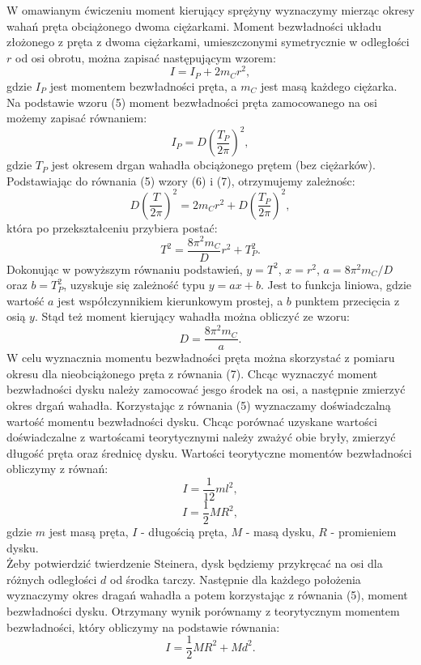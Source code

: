 \documentclass[10pt,a4paper]{article}
\newcommand{\forceindent}{\leavevmode{\parindent=3em\indent}}
\begin{document}
\forceindent W omawianym ćwiczeniu moment kierujący sprężyny wyznaczymy mierząc okresy wahań pręta obciążonego dwoma ciężarkami. Moment bezwładności układu złożonego z pręta z dwoma ciężarkami, umieszczonymi symetrycznie w odległości $r$ od osi obrotu, można zapisać następującym wzorem:
\begin{equation}
I = I_P + 2m_{C}r^2,
\end{equation}
gdzie $I_P$ jest momentem bezwładności pręta, a $m_C$ jest masą każdego ciężarka. \\
Na podstawie wzoru (5) moment bezwładności pręta zamocowanego na osi możemy zapisać równaniem:
\begin{equation}
I_P = D \left(\frac{T_P}{2\pi}\right)^2,
\end{equation}
gdzie $T_P$ jest okresem drgan wahadła obciążonego prętem (bez ciężarków).\\
Podstawiając do równania (5) wzory (6) i (7), otrzymujemy zależnośc:
\begin{equation}
D \left(\frac{T}{2\pi}\right)^2 = 2m_{C}r^2 + D \left(\frac{T_P}{2\pi}\right)^2,
\end{equation}
która po przekształceniu przybiera postać:
\begin{equation}
T^2 = \frac{8\pi^2m_C}{D}r^2 + T_{P}^2.
\end{equation}
Dokonując w powyższym równaniu podstawień, $y=T^2$, $x=r^2$, $a=8\pi^2m_C/D$ oraz $b=T_{P}^2$, uzyskuje się zależność typu $y=ax+b$. Jest to funkcja liniowa, gdzie wartość $a$ jest współczynnikiem kierunkowym prostej, a $b$ punktem przecięcia z osią $y$. Stąd też moment kierujący wahadła można obliczyć ze wzoru:
\begin{equation}
D=\frac{8\pi^2m_{C}}{a}.
\end{equation}
\forceindent W celu wyznacznia momentu bezwładności pręta można skorzystać z pomiaru okresu dla nieobciążonego pręta z równania (7). Chcąc wyznaczyć moment bezwładności dysku należy zamocować jesgo środek na osi, a następnie zmierzyć okres drgań wahadła. Korzystając z równania (5) wyznaczamy doświadczalną wartość momentu bezwładności dysku. Chcąc porównać uzyskane wartości doświadczalne z wartoścami teorytycznymi należy zważyć obie bryły, zmierzyć długość pręta oraz średnicę dysku. Wartości teorytyczne momentów bezwładności obliczymy z równań:
\begin{equation}
I = \frac{1}{12}ml^2,
\end{equation}
\begin{equation}
I = \frac{1}{2}MR^2,
\end{equation}
gdzie $m$ jest masą pręta, $I$ - długością pręta, $M$ - masą dysku, $R$ - promieniem dysku.\\
\forceindent Żeby potwierdzić twierdzenie Steinera, dysk będziemy przykręcać na osi dla różnych odległości $d$ od środka tarczy. Następnie dla każdego położenia wyznaczymy okres dragań wahadła a potem korzystając z równania (5), moment bezwładności dysku. Otrzymany wynik porównamy z teorytycznym momentem bezwładności, który obliczymy na podstawie równania:
\begin{equation}
I = \frac{1}{2}MR^2 + Md^2.
\end{equation} 
\newpage
\end{document}
